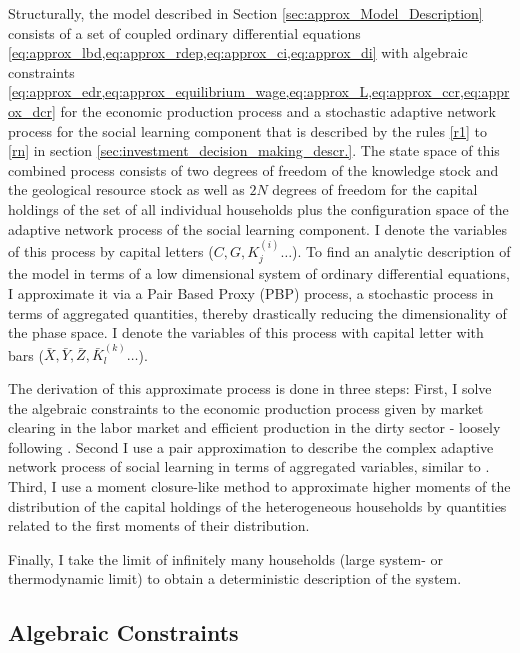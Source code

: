 Structurally, the model described in Section \ref{sec:approx_Model_Description} consists of a set of coupled ordinary differential equations \cref{eq:approx_lbd,eq:approx_rdep,eq:approx_ci,eq:approx_di} with algebraic constraints \cref{eq:approx_edr,eq:approx_equilibrium_wage,eq:approx_L,eq:approx_ccr,eq:approx_dcr} for the economic production process and a stochastic adaptive network process for the social learning component that is described by the rules \ref{r1} to \ref{rn} in section \ref{sec:investment_decision_making_descr.}. The state space of this combined process consists of two degrees of freedom of the knowledge stock and the geological resource stock as well as $2N$ degrees of freedom for the capital holdings of the set of all individual households plus the configuration space of the adaptive network process of the social learning component. I denote the variables of this process by capital letters ($C, G, K_j^{(i)}\dots$).
To find an analytic description of the model in terms of a low dimensional system of ordinary differential equations, I approximate it via a Pair Based Proxy (PBP) process, a stochastic process in terms of aggregated quantities, thereby drastically reducing the dimensionality of the phase space. I denote the variables of this process with capital letter with bars ($\bar{X}, \bar{Y}, \bar{Z}, \bar{K}_l^{(k)}\dots$).

The derivation of this approximate process is done in three steps: First, I solve the algebraic constraints to the economic production process given by market clearing in the labor market and efficient production in the dirty sector - loosely following \cite{Nitzbon2017}. Second I use a pair approximation to describe the complex adaptive network process of social learning in terms of aggregated variables, similar to \cite{Rogers2012}. Third, I use a moment closure-like method to approximate higher moments of the distribution of the capital holdings of the heterogeneous households by quantities related to the first moments of their distribution.

Finally, I take the limit of infinitely many households (large system- or thermodynamic limit) to obtain a deterministic description of the system.

\subsection{Algebraic Constraints}


